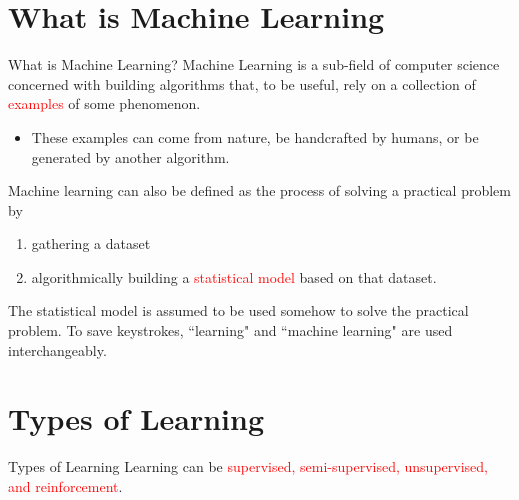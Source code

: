 \documentclass[10pt,dvipsnames]{beamer}
\begin{document}
\section{What is Machine Learning}
\begin{frame}{What is Machine Learning?}
    Machine Learning is a sub-field of computer science concerned with building algorithms that, to be useful, rely on a collection of \textcolor{red}{examples} of some phenomenon.
    \begin{itemize}
        \item These examples can come from nature, be handcrafted by humans, or be generated by another algorithm.
    \end{itemize}
    Machine learning can also be defined as the process of solving a practical problem by
    \begin{enumerate}
        \item gathering a dataset
        \item algorithmically building a \textcolor{red}{statistical model} based on that dataset.
    \end{enumerate}
    The statistical model is assumed to be used somehow to solve the practical problem. To save keystrokes, ``learning" and ``machine learning" are used interchangeably.
\end{frame}

\section{Types of Learning}
\begin{frame}{Types of Learning}
    Learning can be \textcolor{red}{supervised, semi-supervised, unsupervised, and reinforcement}.
\end{frame}
\end{document}
